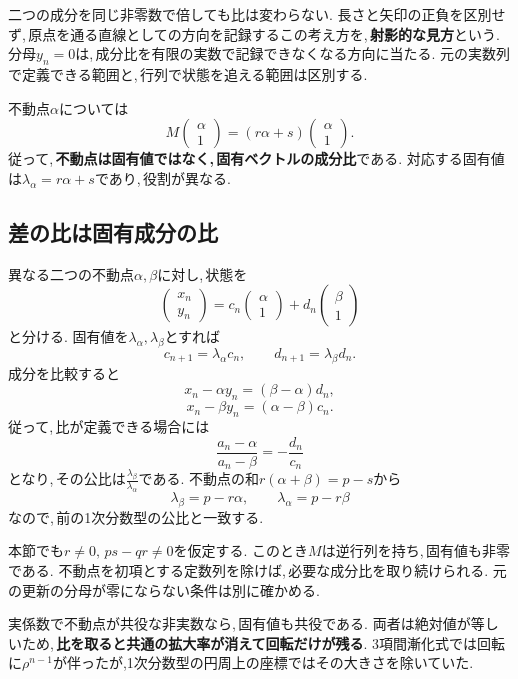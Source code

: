 二つの成分を同じ非零数で倍しても比は変わらない.
長さと矢印の正負を区別せず,\,原点を通る直線としての方向を記録するこの考え方を,\,\textbf{射影的な見方}という.
分母$y_n=0$は,\,成分比を有限の実数で記録できなくなる方向に当たる.
元の実数列で定義できる範囲と,\,行列で状態を追える範囲は区別する.

不動点$\alpha$については
\[
 M\begin{pmatrix}\alpha\\1\end{pmatrix}
 =(r\alpha+s)\begin{pmatrix}\alpha\\1\end{pmatrix}.
\]
従って,\,\textbf{不動点は固有値ではなく,\,固有ベクトルの成分比}である.
対応する固有値は$\lambda_\alpha=r\alpha+s$であり,\,役割が異なる.
\NewFigProjective

\subsection{差の比は固有成分の比}

異なる二つの不動点$\alpha,\beta$に対し,\,状態を
\[
 \begin{pmatrix}x_n\\y_n\end{pmatrix}
 =c_n\begin{pmatrix}\alpha\\1\end{pmatrix}
 +d_n\begin{pmatrix}\beta\\1\end{pmatrix}
\]
と分ける. 固有値を$\lambda_\alpha,\lambda_\beta$とすれば
\[
 c_{n+1}=\lambda_\alpha c_n,\qquad
 d_{n+1}=\lambda_\beta d_n.
\]
成分を比較すると
\[
 x_n-\alpha y_n=(\beta-\alpha)d_n,
\]
\[
 x_n-\beta y_n=(\alpha-\beta)c_n.
\]
従って,\,比が定義できる場合には
\[
 \frac{a_n-\alpha}{a_n-\beta}=-\frac{d_n}{c_n}
\]
となり,\,その公比は$\frac{\lambda_\beta}{\lambda_\alpha}$である.
不動点の和$r(\alpha+\beta)=p-s$から
\[
 \lambda_\beta=p-r\alpha,\qquad
 \lambda_\alpha=p-r\beta
\]
なので,\,前の1次分数型の公比と一致する.

本節でも$r\ne0,\,ps-qr\ne0$を仮定する.
このとき$M$は逆行列を持ち,\,固有値も非零である.
不動点を初項とする定数列を除けば,\,必要な成分比を取り続けられる.
元の更新の分母が零にならない条件は別に確かめる.

実係数で不動点が共役な非実数なら,\,固有値も共役である.
両者は絶対値が等しいため,\,\textbf{比を取ると共通の拡大率が消えて回転だけが残る}.
3項間漸化式では回転に$\rho^{n-1}$が伴ったが,1次分数型の円周上の座標ではその大きさを除いていた.

